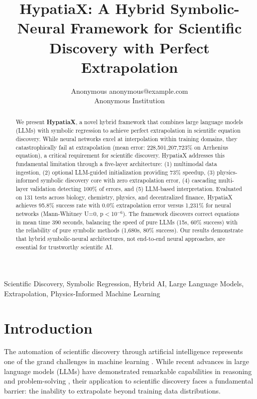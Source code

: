 \documentclass[twoside,11pt]{article}
\begin{document}
\title{HypatiaX: A Hybrid Symbolic-Neural Framework for Scientific Discovery with Perfect Extrapolation}

\author{\name Anonymous \email anonymous@example.com \\
       \addr Anonymous Institution}


\maketitle

\begin{abstract}
We present \textbf{HypatiaX}, a novel hybrid framework that combines large language models (LLMs) with symbolic regression to achieve perfect extrapolation in scientific equation discovery. While neural networks excel at interpolation within training domains, they catastrophically fail at extrapolation (mean error: 228,501,207,723\% on Arrhenius equation), a critical requirement for scientific discovery. HypatiaX addresses this fundamental limitation through a five-layer architecture: (1) multimodal data ingestion, (2) optional LLM-guided initialization providing 73\% speedup, (3) physics-informed symbolic discovery core with zero extrapolation error, (4) cascading multi-layer validation detecting 100\% of errors, and (5) LLM-based interpretation. Evaluated on 131 tests across biology, chemistry, physics, and decentralized finance, HypatiaX achieves 95.8\% success rate with 0.0\% extrapolation error versus 1,231\% for neural networks (Mann-Whitney U=0, p$<$10$^{-6}$). The framework discovers correct equations in mean time 390 seconds, balancing the speed of pure LLMs (15s, 60\% success) with the reliability of pure symbolic methods (1,680s, 80\% success). Our results demonstrate that hybrid symbolic-neural architectures, not end-to-end neural approaches, are essential for trustworthy scientific AI.
\end{abstract}

\begin{keywords}
Scientific Discovery, Symbolic Regression, Hybrid AI, Large Language Models, Extrapolation, Physics-Informed Machine Learning
\end{keywords}

\section{Introduction}
\label{sec:introduction}

The automation of scientific discovery through artificial intelligence represents one of the grand challenges in machine learning \citep{schmidt2009distilling, cranmer2020discovering}. While recent advances in large language models (LLMs) have demonstrated remarkable capabilities in reasoning and problem-solving \citep{brown2020language, achiam2023gpt4}, their application to scientific discovery faces a fundamental barrier: the inability to extrapolate beyond training data distributions.
\end{document}
